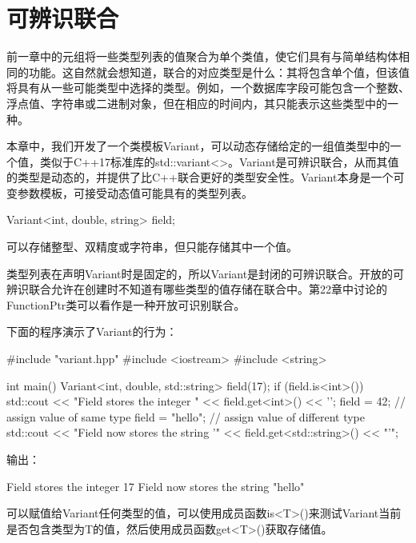 \chapter{可辨识联合}
前一章中的元组将一些类型列表的值聚合为单个类值，使它们具有与简单结构体相同的功能。这自然就会想知道，联合的对应类型是什么：其将包含单个值，但该值将具有从一些可能类型中选择的类型。例如，一个数据库字段可能包含一个整数、浮点值、字符串或二进制对象，但在相应的时间内，其只能表示这些类型中的一种。

本章中，我们开发了一个类模板Variant，可以动态存储给定的一组值类型中的一个值，类似于C++17标准库的std::variant<>。Variant是可辨识联合，从而其值的类型是动态的，并提供了比C++联合更好的类型安全性。Variant本身是一个可变参数模板，可接受动态值可能具有的类型列表。

\begin{cpp}
Variant<int, double, string> field;
\end{cpp}

可以存储整型、双精度或字符串，但只能存储其中一个值。

\begin{notice}
类型列表在声明Variant时是固定的，所以Variant是封闭的可辨识联合。开放的可辨识联合允许在创建时不知道有哪些类型的值存储在联合中。第22章中讨论的FunctionPtr类可以看作是一种开放可识别联合。
\end{notice}

下面的程序演示了Variant的行为：

\begin{cpp}
#include "variant.hpp"
#include <iostream>
#include <string>
 
int main() {
	Variant<int, double, std::string> field(17);
	if (field.is<int>()) {
		std::cout << "Field stores the integer "
				<< field.get<int>() << '\n';
	}
	field = 42; // assign value of same type
	field = "hello"; // assign value of different type
	std::cout << "Field now stores the string '"
			<< field.get<std::string>() << "'\n";
}
\end{cpp}

输出：

\begin{shell}
Field stores the integer 17
Field now stores the string "hello"
\end{shell}

可以赋值给Variant任何类型的值，可以使用成员函数is<T>()来测试Variant当前是否包含类型为T的值，然后使用成员函数get<T>()获取存储值。






































